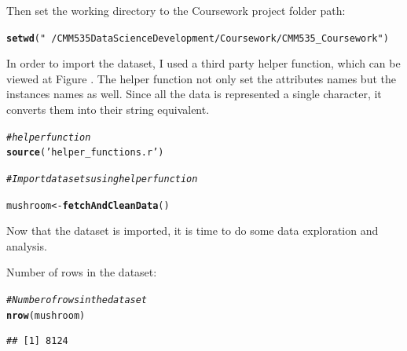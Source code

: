 \documentclass[10pt  ,usenames, dvipsnames]{article}\usepackage[]{graphicx}\usepackage[]{color}
\makeatletter
\newcommand{\hlstr}[1]{\textcolor[rgb]{0.192,0.494,0.8}{#1}}%
\newcommand{\hlcom}[1]{\textcolor[rgb]{0.678,0.584,0.686}{\textit{#1}}}%
\newcommand{\hlstd}[1]{\textcolor[rgb]{0.345,0.345,0.345}{#1}}%
\newcommand{\hlkwb}[1]{\textcolor[rgb]{0.69,0.353,0.396}{#1}}%
\newcommand{\hlkwd}[1]{\textcolor[rgb]{0.737,0.353,0.396}{\textbf{#1}}}%
\newenvironment{kframe}{%
 \def\at@end@of@kframe{}%
 \ifinner\ifhmode%
  \def\at@end@of@kframe{\end{minipage}}%
  \begin{minipage}{\columnwidth}%
 \fi\fi%
 \def\FrameCommand##1{\hskip\@totalleftmargin \hskip-\fboxsep
 \colorbox{shadecolor}{##1}\hskip-\fboxsep
     \hskip-\linewidth \hskip-\@totalleftmargin \hskip\columnwidth}%
 \MakeFramed {\advance\hsize-\width
   \@totalleftmargin\z@ \linewidth\hsize
   \@setminipage}}%
 {\par\unskip\endMakeFramed%
 \at@end@of@kframe}
\newenvironment{knitrout}{}{} %
\makeatother
\begin{document}
Then set the working directory to the Coursework project folder path:
\begin{knitrout}
\color{fgcolor}\begin{kframe}
\begin{alltt}
\hlkwd{setwd}\hlstd{(}\hlstr{"~/CMM535 Data Science Development/Coursework/CMM535_Coursework"}\hlstd{)}
\end{alltt}
\end{kframe}
\end{knitrout}



In order to import the dataset, I used a third party helper function, which can be viewed at Figure .
The helper function not only set the attributes names but the instances names as well. Since all the data is represented a single character, it converts them into their string equivalent.


\begin{knitrout}
\color{fgcolor}\begin{kframe}
\begin{alltt}
\hlcom{#helper function}
\hlkwd{source}\hlstd{(}\hlstr{'helper_functions.r'}\hlstd{)}

\hlcom{#Import datasets using helper function}

\hlstd{mushroom} \hlkwb{<-} \hlkwd{fetchAndCleanData}\hlstd{()}
\end{alltt}
\end{kframe}
\end{knitrout}





Now that the dataset is imported, it is time to do some data exploration and analysis.

Number of rows in the dataset:

\begin{knitrout}
\color{fgcolor}\begin{kframe}
\begin{alltt}
\hlcom{#Number of rows in the dataset}
\hlkwd{nrow}\hlstd{(mushroom)}
\end{alltt}
\end{kframe}
\end{knitrout}


\begin{knitrout}
\color{fgcolor}\begin{kframe}
\begin{verbatim}
## [1] 8124
\end{verbatim}
\end{kframe}
\end{knitrout}
\end{document}
